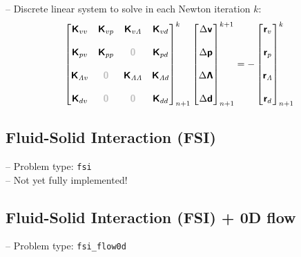 \documentclass[a4paper,12pt]{report}
\newcommand{\bs}[1]{\boldsymbol{#1}}
\newcommand{\zerom}{\textcolor{lightgray}{\bs{\mathsf{0}}}}
\newcommand{\ROP}{\bs{\mathsf{r}}}
\newcommand{\LMZ}{\bs{\mathsf{\Lambda}}}
\newcommand{\lmzi}{\mathit{\Lambda}} %
\begin{document}
-- Discrete linear system to solve in each Newton iteration $k$:
\begin{align}
\begin{bmatrix} \bs{\mathsf{K}}_{vv} & \bs{\mathsf{K}}_{vp} & \bs{\mathsf{K}}_{v\lmzi} & \bs{\mathsf{K}}_{vd} \\ \\ \bs{\mathsf{K}}_{pv} & \bs{\mathsf{K}}_{pp} & \zerom & \bs{\mathsf{K}}_{pd} \\ \\ \bs{\mathsf{K}}_{\lmzi v} & \zerom & \bs{\mathsf{K}}_{\lmzi \lmzi} & \bs{\mathsf{K}}_{\lmzi d} \\ \\ \bs{\mathsf{K}}_{dv}  & \zerom & \zerom & \bs{\mathsf{K}}_{dd} \end{bmatrix}_{n+1}^{k}\begin{bmatrix} \Delta\bs{\mathsf{v}} \\ \\ \Delta\bs{\mathsf{p}} \\ \\ \Delta\LMZ \\ \\ \Delta\bs{\mathsf{d}} \end{bmatrix}_{n+1}^{k+1}=-\begin{bmatrix} \ROP_{v} \\ \\ \ROP_{p} \\ \\ \ROP_{\lmzi} \\ \\ \ROP_{d}\end{bmatrix}_{n+1}^{k} \label{eq:lin_sys_fluid_ale_0d}
\end{align}


\subsection{Fluid-Solid Interaction (FSI)}\label{subsec:fsi}

-- Problem type: \verb.fsi.\\

-- Not yet fully implemented!


\subsection{Fluid-Solid Interaction (FSI) + 0D flow}\label{subsec:fsi_flow0d}

-- Problem type: \verb.fsi_flow0d.\\
\end{document}
